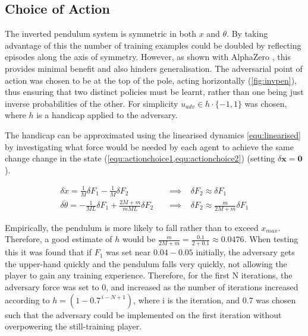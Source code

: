 \documentclass[../main.tex]{subfiles}
\begin{document}
\subsection{Choice of Action}

The inverted pendulum system is symmetric in both $x$ and $\theta$. By taking advantage of this the number of training examples could be doubled by reflecting episodes along the axis of symmetry. However, as shown with AlphaZero \cite{AlphaZero}, this provides minimal benefit and also hinders generalisation. The adversarial point of action was chosen to be at the top of the pole, acting horizontally (\cref{fig:invpen}), thus ensuring that two distinct policies must be learnt, rather than one being just inverse probabilities of the other. For simplicity $u_{adv} \in h \cdot \{-1, 1\}$ was chosen, where $h$ is a handicap applied to the adversary.

The handicap can be approximated using the linearised dynamics \cref{equ:linearised} by investigating what force would be needed by each agent to achieve the same change change in the state (\cref{equ:actionchoice1,equ:actionchoice2}) (setting $\delta \boldsymbol{x} = \boldsymbol{0}$).

\begin{subequations}
\begin{align}
   \delta \ddot{x} = \frac{1}{M}\delta F_1 - \frac{1}{M} \delta F_2 \hspace{10pt} &\implies \hspace{10pt} \delta F_2 \approx \delta F_1 \label{equ:actionchoice1} \\
   \delta \ddot{\theta} = -\frac{1}{ML} \delta F_1 + \frac{2M + m}{mML} \delta F_2 \hspace{10pt} &\implies \hspace{10pt} \delta F_2 \approx \frac{m}{2M + m} \delta F_1 \label{equ:actionchoice2}
\end{align}
\end{subequations}

Empirically, the pendulum is more likely to fall rather than to exceed $x_{max}$. Therefore, a good estimate of $h$ would be $\frac{m}{2M+m} = \frac{0.1}{2+0.1} \approx 0.0476$. When testing this it was found that if $F_1$ was set near $0.04-0.05$ initially, the adversary gets the upper-hand quickly and the pendulum falls very quickly, not allowing the player to gain any training experience. Therefore, for the first N iterations, the adversary force was set to 0, and increased as the number of iterations increased according to $h = (1-0.7^{\,i-N+1})$, where i is the iteration, and 0.7 was chosen such that the adversary could be implemented on the first iteration without overpowering the still-training player.
\end{document}
